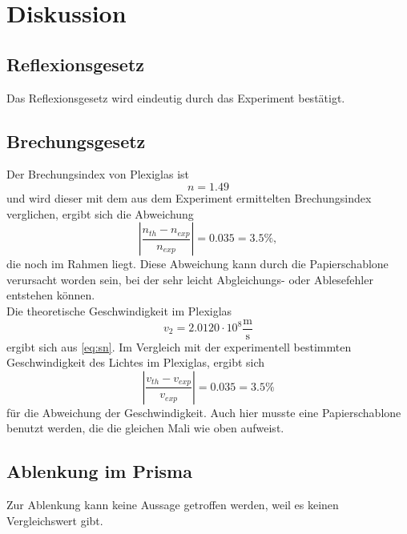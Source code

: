 \section{Diskussion}
\label{sec:Diskussion}

\subsection{Reflexionsgesetz}
Das Reflexionsgesetz wird eindeutig durch das Experiment bestätigt.

\subsection{Brechungsgesetz}
Der Brechungsindex von Plexiglas ist 
\begin{equation*}
  n=1.49
\end{equation*}
und wird dieser mit dem aus dem Experiment ermittelten Brechungsindex verglichen, ergibt sich die Abweichung
\begin{equation*}
  |\frac{n_{th} - n_{exp}}{n_{exp}}|=0.035=3.5\%,
\end{equation*}
die noch im Rahmen liegt. Diese Abweichung kann durch die Papierschablone verursacht worden sein, bei der sehr leicht Abgleichungs- oder Ablesefehler entstehen können.\\
Die theoretische Geschwindigkeit im Plexiglas
\begin{equation*}
  v_2=2.0120\cdot 10^8 \frac{\textrm{m}}{\textrm{s}}
\end{equation*} 
ergibt sich aus \eqref{eq:sn}. Im Vergleich mit der experimentell bestimmten Geschwindigkeit des Lichtes im Plexiglas, ergibt sich 
\begin{equation*}
  |\frac{v_{th} - v_{exp}}{v_{exp}}|=0.035=3.5\%
\end{equation*}
für die Abweichung der Geschwindigkeit. Auch hier musste eine Papierschablone benutzt werden, die die gleichen Mali wie oben aufweist.

\subsection{Ablenkung im Prisma}
Zur Ablenkung kann keine Aussage getroffen werden, weil es keinen Vergleichswert gibt. 

